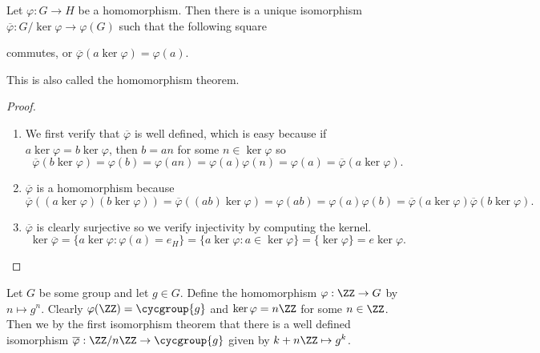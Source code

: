 \begin{thm}
Let $\varphi : G \to H$ be a homomorphism. Then there is a unique
isomorphism $\overline{\varphi} : G / \ker\varphi \to \varphi(G)$ such
that the following square
\begin{center}
\end{center}
commutes, or $\overline{\varphi}(a\ker\varphi) = \varphi(a)$.

This is also called the homomorphism theorem.
\end{thm}

\begin{proof}
$ $
\begin{enumerate}
\item We first verify that $\overline\varphi$ is well defined, which is
easy because if $a\ker\varphi = b\ker\varphi$, then $b = an$ for some $n
\in \ker\varphi$ so
\[ \overline\varphi(b\ker\varphi) = \varphi(b) = \varphi(an) =
\varphi(a)\varphi(n) = \varphi(a) = \overline\varphi(a\ker\varphi). \]
\item $\overline\varphi$ is a homomorphism because
\[ \overline\varphi((a\ker\varphi)(b\ker\varphi)) =
\overline\varphi((ab)\ker\varphi) = \varphi(ab) = \varphi(a)\varphi(b) =
\overline\varphi(a\ker\varphi) \overline\varphi(b\ker\varphi). \]
\item $\overline\varphi$ is clearly surjective so we verify injectivity
by computing the kernel.
\[ \ker\overline\varphi = \lbrace a\ker\varphi : \varphi(a) = e_H
\rbrace = \lbrace a\ker\varphi : a \in \ker\varphi \rbrace = \lbrace
\ker\varphi \rbrace = e\ker\varphi. \]
\end{enumerate}
\end{proof}

\begin{ex}
Let $G$ be some group and let $g \in G$. Define the homomorphism
$\varphi : \ZZ \to G$ by $n \mapsto g^n$. Clearly $\varphi(\ZZ) =
\cycgroup{g}$ and $\ker\varphi = n\ZZ$ for some $n \in \ZZ$. Then we
by the first isomorphism theorem that there is a well defined
isomorphism $\overline\varphi : \ZZ / n\ZZ \to \cycgroup{g}$ given by
$k + n\ZZ \mapsto g^k$.
\end{ex}
